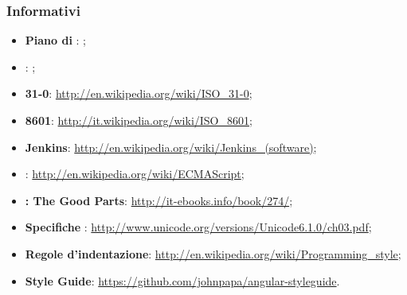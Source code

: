 \subsubsection{Informativi}
\begin{itemize}
\item \textbf{Piano di }: \pianoDiProgetto;
\item \textbf{\PQ}: \pianoDiQualifica;
\item \textbf{ 31-0}: \url{http://en.wikipedia.org/wiki/ISO_31-0};
\item \textbf{ 8601}: \url{http://it.wikipedia.org/wiki/ISO_8601};
\item \textbf{Jenkins}: \url{http://en.wikipedia.org/wiki/Jenkins_(software)};
\item \textbf{}: \url{http://en.wikipedia.org/wiki/ECMAScript};
\item \textbf{: The Good Parts}: \url{http://it-ebooks.info/book/274/};
\item \textbf{Specifiche }: \url{http://www.unicode.org/versions/Unicode6.1.0/ch03.pdf};
\item \textbf{Regole d'indentazione}: \url{http://en.wikipedia.org/wiki/Programming_style};
\item \textbf{ Style Guide}: \url{https://github.com/johnpapa/angular-styleguide}.
\end{itemize}
